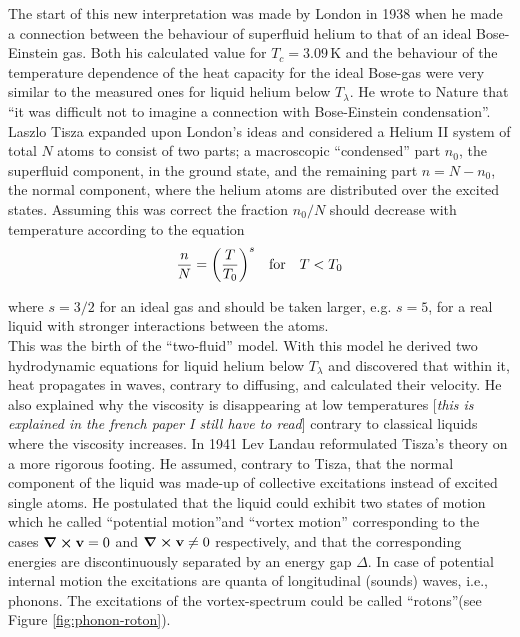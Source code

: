 \documentclass[12pt,a4paper]{book}
\renewcommand{\vec}[1]{\bm{\mathrm{#1}}}
\newcommand{\unit}[1]{\,\mathrm{#1}}
\begin{document}
		The start of this new interpretation was made by London in 1938 when he made a connection between the behaviour of superfluid helium to that of an ideal Bose-Einstein gas. Both his calculated value for $T_c=3.09\unit{K}$ and the behaviour of the temperature dependence of the heat capacity for the ideal Bose-gas were very similar to the measured ones for liquid helium below $T_\lambda$. He wrote to Nature that ``it was difficult not to imagine a connection with Bose-Einstein condensation''. Laszlo Tisza expanded upon London's ideas and considered a Helium II system of total $N$ atoms to consist of two parts; a macroscopic ``condensed'' part $n_0$, the superfluid component, in the ground state, and the remaining part $n=N-n_0$, the normal component, where the helium atoms are distributed over the excited states. Assuming this was correct the fraction $n_0/N$ should decrease with temperature according to the equation\\

		\begin{align}
			\frac{n}{N} = \qty(\frac{T}{T_0})^s \quad \text{for} \quad T<T_0
		\end{align}

		where $s=3/2$ for an ideal gas and should be taken larger, e.g. $s=5$, for a real liquid with stronger interactions between the atoms.\\
		
		This was the birth of the ``two-fluid'' model. With this model he derived two hydrodynamic equations for liquid helium below $T_\lambda$ and discovered that within it, heat propagates in waves, contrary to diffusing, and calculated their velocity. He also explained why the viscosity is disappearing at low temperatures [\emph{this is explained in the french paper I still have to read}] contrary to classical liquids where the viscosity increases. In 1941 Lev Landau reformulated Tisza's theory on a more rigorous footing. He assumed, contrary to Tisza, that the normal component of the liquid was made-up of collective excitations instead of excited single atoms. He postulated that the liquid could exhibit two states of motion which he called ``potential motion''and ``vortex motion'' corresponding to the cases $\curl{\vec{v}}=0$ and $\curl{\vec{v}} \neq 0$ respectively, and that the corresponding energies are discontinuously separated by an energy gap $\Delta$. In case of potential internal motion  the excitations are quanta of longitudinal (sounds) waves, i.e., phonons. The excitations of the vortex-spectrum could be called ``rotons''(see Figure \ref{fig:phonon-roton}).\\
\end{document}
